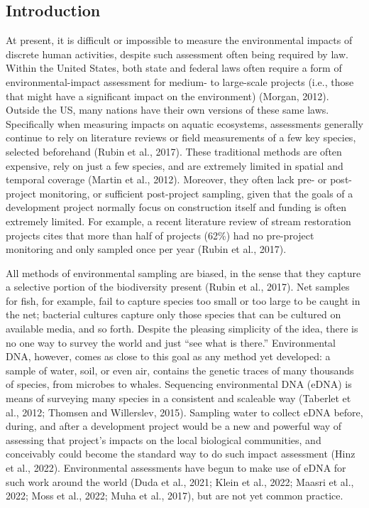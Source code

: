 \documentclass[
]{article}
\begin{document}
\hypertarget{introduction}{%
\subsection{Introduction}\label{introduction}}

At present, it is difficult or impossible to measure the environmental
impacts of discrete human activities, despite such assessment often
being required by law. Within the United States, both state and federal
laws often require a form of environmental-impact assessment for medium-
to large-scale projects (i.e., those that might have a significant
impact on the environment) (Morgan, 2012). Outside the US, many nations
have their own versions of these same laws. Specifically when measuring
impacts on aquatic ecosystems, assessments generally continue to rely on
literature reviews or field measurements of a few key species, selected
beforehand (Rubin et al., 2017). These traditional methods are often
expensive, rely on just a few species, and are extremely limited in
spatial and temporal coverage (Martin et al., 2012). Moreover, they
often lack pre- or post-project monitoring, or sufficient post-project
sampling, given that the goals of a development project normally focus
on construction itself and funding is often extremely limited. For
example, a recent literature review of stream restoration projects cites
that more than half of projects (62\%) had no pre-project monitoring and
only sampled once per year (Rubin et al., 2017).

All methods of environmental sampling are biased, in the sense that they
capture a selective portion of the biodiversity present (Rubin et al.,
2017). Net samples for fish, for example, fail to capture species too
small or too large to be caught in the net; bacterial cultures capture
only those species that can be cultured on available media, and so
forth. Despite the pleasing simplicity of the idea, there is no one way
to survey the world and just ``see what is there.'' Environmental DNA,
however, comes as close to this goal as any method yet developed: a
sample of water, soil, or even air, contains the genetic traces of many
thousands of species, from microbes to whales. Sequencing environmental
DNA (eDNA) is means of surveying many species in a consistent and
scaleable way (Taberlet et al., 2012; Thomsen and Willerslev, 2015).
Sampling water to collect eDNA before, during, and after a development
project would be a new and powerful way of assessing that project's
impacts on the local biological communities, and conceivably could
become the standard way to do such impact assessment (Hinz et al.,
2022). Environmental assessments have begun to make use of eDNA for such
work around the world (Duda et al., 2021; Klein et al., 2022; Maasri et
al., 2022; Moss et al., 2022; Muha et al., 2017), but are not yet common
practice.
\end{document}
